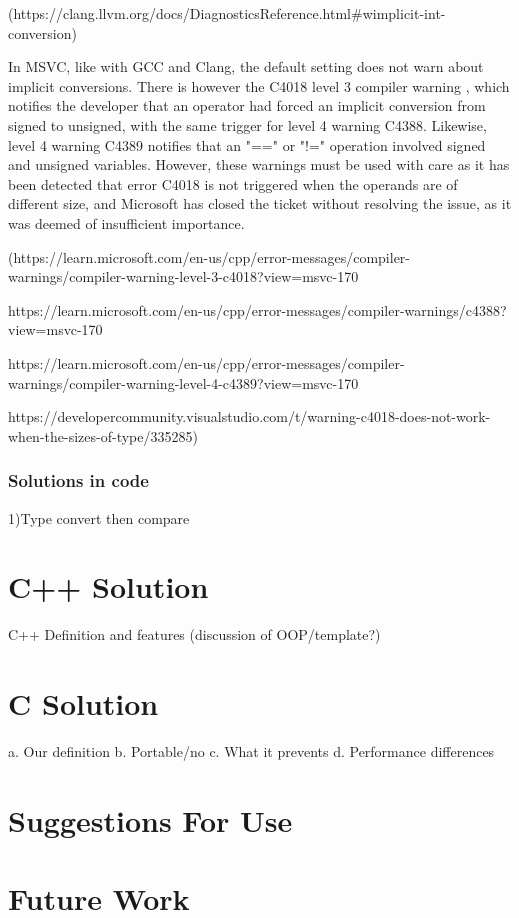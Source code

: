 \documentclass[11pt,letterpaper]{article}
\begin{document}
(https://clang.llvm.org/docs/DiagnosticsReference.html#wimplicit-int-conversion)

In MSVC, like with GCC and Clang, the default setting does not warn about implicit conversions. There is however the C4018 level 3 compiler warning , which notifies the developer that an operator had forced an implicit conversion from signed to unsigned, with the same trigger for level 4 warning C4388. Likewise, level 4 warning C4389 notifies that an "==" or "!=" operation involved signed and unsigned variables. However, these warnings must be used with care as it has been detected that error C4018 is not triggered when the operands are of different size, and Microsoft has closed the ticket without resolving the issue, as it was deemed of insufficient importance. 

(https://learn.microsoft.com/en-us/cpp/error-messages/compiler-warnings/compiler-warning-level-3-c4018?view=msvc-170

https://learn.microsoft.com/en-us/cpp/error-messages/compiler-warnings/c4388?view=msvc-170

https://learn.microsoft.com/en-us/cpp/error-messages/compiler-warnings/compiler-warning-level-4-c4389?view=msvc-170

https://developercommunity.visualstudio.com/t/warning-c4018-does-not-work-when-the-sizes-of-type/335285)



\subsubsection{Solutions in code}
 1)Type convert then compare




\section{C++ Solution}
\label{sec:cppimplementation}

C++ Definition and features (discussion of OOP/template?)

\blindtext
{}

\section{C Solution}
\label{sec:cimplementation}
a.	Our definition
b.	Portable/no
c.	What it prevents
d.	Performance differences

\section{Suggestions For Use}
\label{sec:suggestions}

\section{Future Work}
\label{sec:futurework}



\printindex
\end{document}
